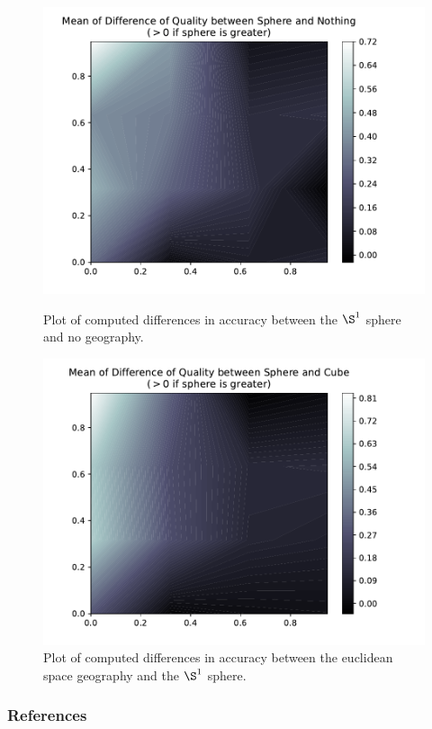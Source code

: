 \documentclass[ratio=169]{beamercours}
\begin{document}
\begin{frame}[allowframebreaks]
	\begin{figure}[h]
	\centering
	\hfill
	\begin{minipage}{.45\textwidth}
		\includegraphics[width=\linewidth]{../Figures/qual_diff_sphere_none}
		\caption{Plot of computed differences in accuracy between the $\S^{1}$ sphere and no geography.}
	\label{nonesphere}
	\end{minipage}
	\hfill
	\begin{minipage}{.45\textwidth}
		\includegraphics[width=\linewidth]{../Figures/qual_diff_sphere_cube}
	\caption{Plot of computed differences in accuracy between the euclidean space geography and the $\S^{1}$ sphere.}
	\label{cubesphere}
	\end{minipage}
	\hfill
	\end{figure}

\end{frame}

\begin{frame}[t]
	\frametitle{References}
	
	
\end{frame}
\end{document}
